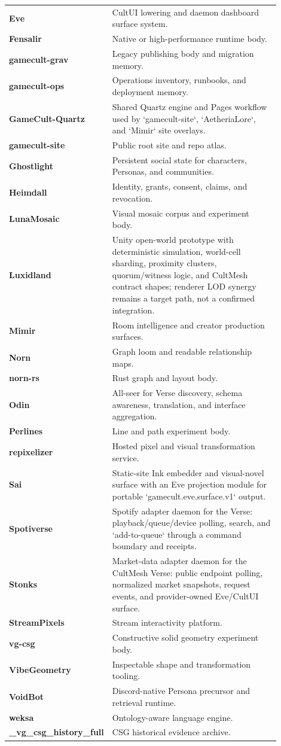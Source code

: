 \documentclass[11pt,oneside]{article}
\begin{document}
\begin{longtable}{>{\bfseries}p{0.28\linewidth}p{0.62\linewidth}}
Eve & CultUI lowering and daemon dashboard surface system.\\
Fensalir & Native or high-performance runtime body.\\
gamecult-grav & Legacy publishing body and migration memory.\\
gamecult-ops & Operations inventory, runbooks, and deployment memory.\\
GameCult-Quartz & Shared Quartz engine and Pages workflow used by `gamecult-site`, `AetheriaLore`, and `Mimir` site overlays.\\
gamecult-site & Public root site and repo atlas.\\
Ghostlight & Persistent social state for characters, Personas, and communities.\\
Heimdall & Identity, grants, consent, claims, and revocation.\\
LunaMosaic & Visual mosaic corpus and experiment body.\\
Luxidland & Unity open-world prototype with deterministic simulation, world-cell sharding, proximity clusters, quorum/witness logic, and CultMesh contract shapes; renderer LOD synergy remains a target path, not a confirmed integration.\\
Mimir & Room intelligence and creator production surfaces.\\
Norn & Graph loom and readable relationship maps.\\
norn-rs & Rust graph and layout body.\\
Odin & All-seer for Verse discovery, schema awareness, translation, and interface aggregation.\\
Perlines & Line and path experiment body.\\
repixelizer & Hosted pixel and visual transformation service.\\
Sai & Static-site Ink embedder and visual-novel surface with an Eve projection module for portable `gamecult.eve.surface.v1` output.\\
Spotiverse & Spotify adapter daemon for the Verse: playback/queue/device polling, search, and `add-to-queue` through a command boundary and receipts.\\
Stonks & Market-data adapter daemon for the CultMesh Verse: public endpoint polling, normalized market snapshots, request events, and provider-owned Eve/CultUI surface.\\
StreamPixels & Stream interactivity platform.\\
vg-csg & Constructive solid geometry experiment body.\\
VibeGeometry & Inspectable shape and transformation tooling.\\
VoidBot & Discord-native Persona precursor and retrieval runtime.\\
weksa & Ontology-aware language engine.\\
\_vg\_csg\_history\_full & CSG historical evidence archive.\\
\bottomrule
\end{longtable}
\end{document}

